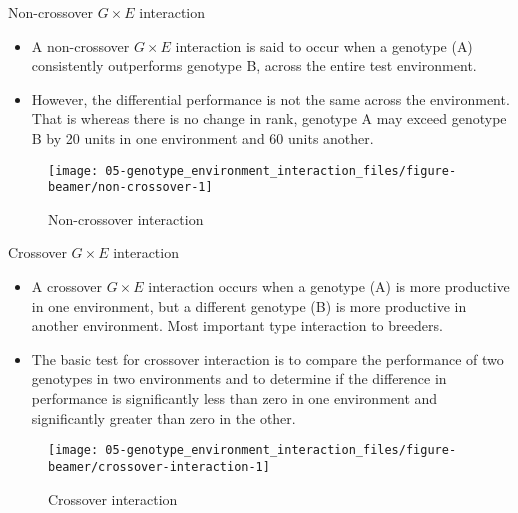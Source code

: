 \documentclass[11pt,dvipsnames,ignorenonframetext,aspectratio=169]{beamer}
\providecommand{\tightlist}{%
  \setlength{\itemsep}{0pt}\setlength{\parskip}{0pt}}
\begin{document}
\begin{frame}{Non-crossover \(G \times E\) interaction}
\protect\hypertarget{non-crossover-g-times-e-interaction}{}

\begin{itemize}
\tightlist
\item
  A non-crossover \(G \times E\) interaction is said to occur when a
  genotype (A) consistently outperforms genotype B, across the entire
  test environment.
\item
  However, the differential performance is not the same across the
  environment. That is whereas there is no change in rank, genotype A
  may exceed genotype B by 20 units in one environment and 60 units
  another.
\end{itemize}

\begin{figure}
\texttt{[image: 05-genotype\_environment\_interaction\_files/figure-beamer/non-crossover-1]} \caption{Non-crossover interaction}\label{fig:non-crossover}
\end{figure}

\end{frame}

\begin{frame}{Crossover \(G \times E\) interaction}
\protect\hypertarget{crossover-g-times-e-interaction}{}

\begin{itemize}
\tightlist
\item
  A crossover \(G \times E\) interaction occurs when a genotype (A) is
  more productive in one environment, but a different genotype (B) is
  more productive in another environment. Most important type
  interaction to breeders.
\item
  The basic test for crossover interaction is to compare the performance
  of two genotypes in two environments and to determine if the
  difference in performance is significantly less than zero in one
  environment and significantly greater than zero in the other.
\end{itemize}

\begin{figure}
\texttt{[image: 05-genotype\_environment\_interaction\_files/figure-beamer/crossover-interaction-1]} \caption{Crossover interaction}\label{fig:crossover-interaction}
\end{figure}

\end{frame}
\end{document}
